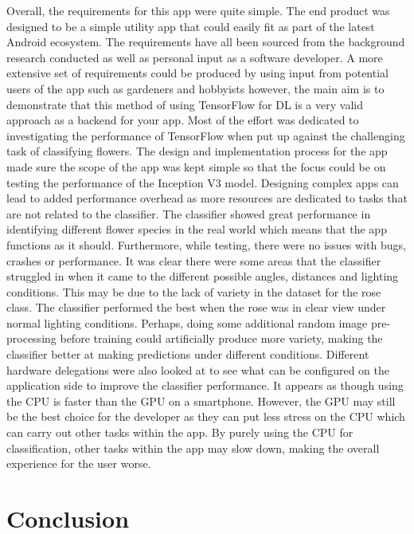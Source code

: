 \documentclass[12pt,a4paper]{report}
\begin{document}
Overall, the requirements for this app were quite simple. The end product was designed to be a simple utility app that 
could easily fit as part of the latest Android ecosystem. The requirements have all been sourced from the background 
research conducted as well as personal input as a software developer. A more extensive set of requirements could be 
produced by using input from potential users of the app such as gardeners and hobbyists however, the main aim is to 
demonstrate that this method of using TensorFlow for DL is a very valid approach as a backend for your app. 
Most of the effort was dedicated to investigating the performance of TensorFlow when put up against the challenging 
task of classifying flowers. The design and implementation process for the app made sure the scope of the app was kept 
simple so that the focus could be on testing the performance of the Inception V3 model. Designing complex apps can 
lead to added performance overhead as more resources are dedicated to tasks that are not related to the classifier. The 
classifier showed great performance in identifying different flower species in the real world which means that the app 
functions as it should. Furthermore, while testing, there were no issues with bugs, crashes or performance. It was clear
there were some areas that the classifier struggled in when it came to the different possible angles, distances and 
lighting conditions. This may be due to the lack of variety in the dataset for the rose class.  The classifier performed
the best when the rose was in clear view under normal lighting conditions. Perhaps, doing some additional random image 
pre-processing before training could artificially produce more variety, making the classifier better at making 
predictions under different conditions. Different hardware delegations were also looked at to see what can be configured
on the application side to improve the classifier performance. It appears as though using the CPU is faster than the GPU
on a smartphone. However, the GPU may still be the best choice for the developer as they can put less stress on the CPU 
which can carry out other tasks within the app. By purely using the CPU for classification, other tasks within the app 
may slow down, making the overall experience for the user worse. 

\clearpage

\chapter{Conclusion}
\end{document}
